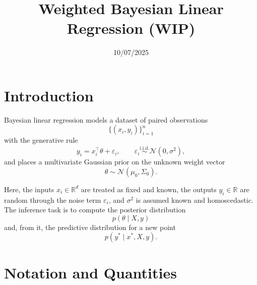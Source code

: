 \documentclass[11pt]{article}
\title{Weighted Bayesian Linear Regression (WIP)}
\date{10/07/2025}
\begin{document}
\maketitle

\section{Introduction}

Bayesian linear regression models a dataset of paired observations
\[
\{(x_i, y_i)\}_{i=1}^n
\]
with the generative rule
\begin{equation}
y_i = x_i^\top \theta + \varepsilon_i,\qquad
\varepsilon_i \overset{\mathrm{i.i.d.}}{\sim} \mathcal{N}(0,\sigma^2),
\end{equation}
and places a multivariate Gaussian prior on the unknown weight vector
\begin{equation}
\theta \sim \mathcal{N}(\mu_0,\Sigma_0).
\end{equation}

Here, the inputs $x_i \in \mathbb{R}^d$ are treated as fixed and known, the outputs $y_i \in \mathbb{R}$ are random through the noise term $\varepsilon_i$, and $\sigma^2$ is assumed known and homoscedastic. The inference task is to compute the posterior distribution
\[
p(\theta \mid X, y)
\]
and, from it, the predictive distribution for a new point
\[
p(y^* \mid x^*, X, y).
\]

\section{Notation and Quantities}
\end{document}
